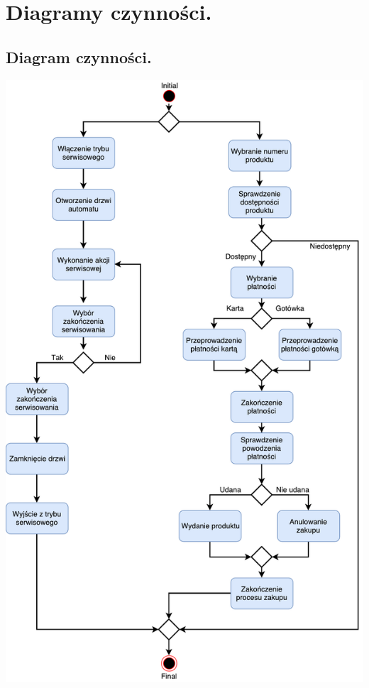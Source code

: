 \documentclass[11pt]{article}
\begin{document}
	\section{Diagramy czynności.}	
		\subsection{Diagram czynności.}
		\begin{center}
			\includegraphics[scale=0.66]{czynnosci1.pdf}
		\end{center}
		\newpage
\end{document}
